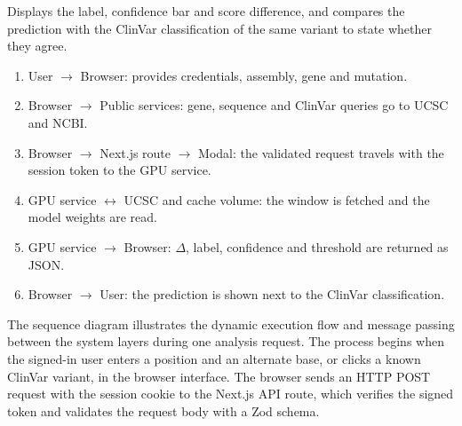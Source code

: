 Displays the label, confidence bar and score difference, and compares the prediction with the ClinVar classification of the same variant to state whether they agree.

\begin{figure}[!tb]\centering\setlength{\diagH}{0.8\textheight}\diagDFDone\par\vspace{6pt}\label{fig:4.3}\end{figure}
\vspace{4pt}
\begin{enumerate}
\item User $\rightarrow$ Browser: provides credentials, assembly, gene and mutation.
\item Browser $\rightarrow$ Public services: gene, sequence and ClinVar queries go to UCSC and NCBI.
\item Browser $\rightarrow$ Next.js route $\rightarrow$ Modal: the validated request travels with the session token to the GPU service.
\item GPU service $\leftrightarrow$ UCSC and cache volume: the window is fetched and the model weights are read.
\item GPU service $\rightarrow$ Browser: $\Delta$, label, confidence and threshold are returned as JSON.
\item Browser $\rightarrow$ User: the prediction is shown next to the ClinVar classification.
\end{enumerate}

\vspace{6pt}
\vspace{-2pt}
\begin{figure}[!tb]\centering\setlength{\diagH}{0.8\textheight}\diagSeq\par\vspace{6pt}\label{fig:4.4}\end{figure}
\vspace{-2pt}
The sequence diagram illustrates the dynamic execution flow and message passing between the system layers during one analysis request. The process begins when the signed-in user enters a position and an alternate base, or clicks a known ClinVar variant, in the browser interface. The browser sends an HTTP POST request with the session cookie to the Next.js API route, which verifies the signed token and validates the request body with a Zod schema.

